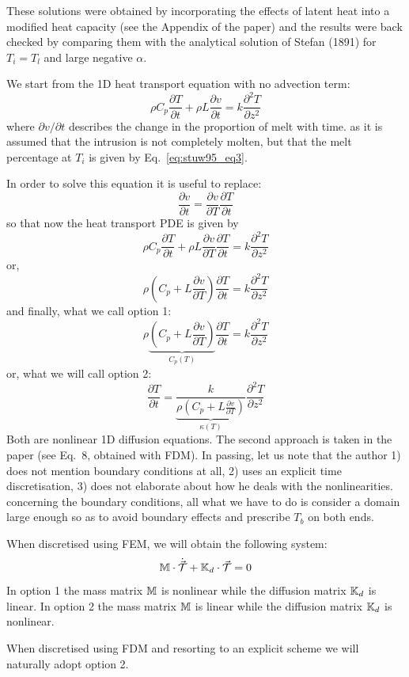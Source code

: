 These solutions were obtained by incorporating the effects of latent heat into a modified heat
capacity (see the Appendix of the paper) and the results were back checked by
comparing them with the analytical solution of
Stefan (1891) for $T_i = T_l$ and large negative $\alpha$.

We start from the 1D heat transport equation with no advection term:
\[
\rho C_p \frac{\partial T}{\partial t} + \rho L \frac{\partial v}{\partial t} 
= k  \frac{\partial^2 T}{\partial z^2} 
\]
where $\partial v/ \partial t$ describes the change in the proportion of melt with time.
as it is assumed that the intrusion is not completely molten, but that the
melt percentage at $T_i$ is given by Eq.~\eqref{eq:stuw95_eq3}.

In order to solve this equation it is useful to replace:
\[
\frac{\partial v}{\partial t} = \frac{\partial v}{\partial T}\frac{\partial T}{\partial t}
\]
so that now the heat transport PDE is given by
\[
\rho C_p \frac{\partial T}{\partial t} + \rho L 
\frac{\partial v}{\partial T}\frac{\partial T}{\partial t}
= k  \frac{\partial^2 T}{\partial z^2} 
\]
or,
\[
\rho \left(C_p + L \frac{\partial v}{\partial T} \right)
\frac{\partial T}{\partial t} = k  \frac{\partial^2 T}{\partial z^2} 
\]
and finally, what we call option 1:
\[
\boxed{
\rho \underbrace{\left(C_p + L \frac{\partial v}{\partial T} \right)}_{C_p(T)}
\frac{\partial T}{\partial t} = k  \frac{\partial^2 T}{\partial z^2} 
}
\]
or, what we will call option 2:
\[
\boxed{
\frac{\partial T}{\partial t} = 
\underbrace{\frac{k}{\rho \left(C_p + L \frac{\partial v}{\partial T} \right)}}_{\kappa(T)} \frac{\partial^2 T}{\partial z^2} 
}
\]
Both are nonlinear 1D diffusion equations.  The second approach 
is taken in the paper (see Eq.~8, obtained with FDM).
In passing, let us note that the author 
1) does not mention boundary conditions at all,
2) uses an explicit time discretisation,
3) does not elaborate about how he deals with the nonlinearities.    
concerning the boundary conditions, all what we have to do is 
consider a domain large enough so 
as to avoid boundary effects and prescribe $T_b$ on both ends.

When discretised using FEM, we will obtain the following system:
\[
{\mathbb{M}} \cdot \dot{\vec{{\cal T}}} + {\mathbb{K}}_d \cdot \vec{\cal T} = 0
\]
In option 1 the mass matrix ${\mathbb{M}}$ is nonlinear while the diffusion matrix ${\mathbb{K}}_d$ is linear.
In option 2 the mass matrix ${\mathbb{M}}$ is linear while the diffusion matrix ${\mathbb{K}}_d$ is nonlinear.

When discretised using FDM and resorting to an explicit scheme we will
naturally adopt option 2.

